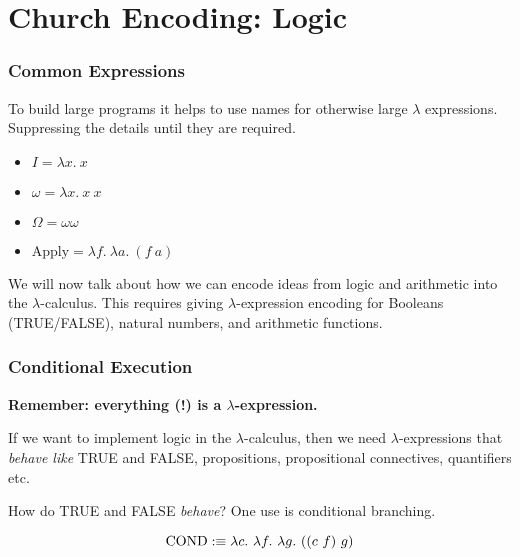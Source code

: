 \documentclass{beamer}
\begin{document}
\section{Church Encoding: Logic}

\begin{frame}
	\frametitle{Common Expressions}

	
	To build large programs it helps to use names for otherwise large $\lambda$ expressions. Suppressing the details until they are required. %

	\vspace{0.5cm}

	\begin{itemize}
		\item[] $I = \lambda x. \ x$
		\item[] $\omega = \lambda x. \ x \ x$
		\item[] $\Omega = \omega \omega$
		\item[] $\text{Apply} = \lambda f. \ \lambda a. \ (f \ a)$
	\end{itemize}

	\vspace{0.5cm}

	We will now talk about how we can encode ideas from logic and arithmetic into the $\lambda$-calculus. This requires giving $\lambda$-expression encoding for Booleans (TRUE/FALSE), natural numbers, and arithmetic functions.

\end{frame}

\begin{frame}
	\frametitle{Conditional Execution}

	{\bf Remember: everything (!) is a $\lambda$-expression.}

	If we want to implement logic in the $\lambda$-calculus, then we need $\lambda$-expressions that \emph{behave like} TRUE and FALSE, propositions, propositional connectives, quantifiers etc.

	\vspace{0.5cm}

	How do TRUE and FALSE \emph{behave}? One use is conditional branching.

	$$\COND :\equiv \lambda c. \ \lambda f. \ \lambda g. \ ((c \ f) \ g) $$

	\vspace{2cm}

\end{frame}
\end{document}
